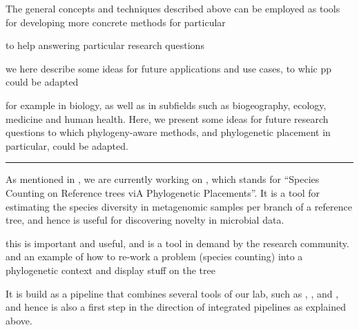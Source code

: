 
The general concepts and techniques described above %
can be employed as tools for developing more concrete methods for particular

to help answering particular research questions

we here describe some ideas for future
applications and use cases,
to whic pp could be adapted

for example
in biology, as well as in subfields such as biogeography, ecology, medicine and human health.
Here, we present some ideas for future research questions to which phylogeny-aware methods,
and phylogenetic placement in particular, could be adapted.



\noindent\rule{\textwidth}{0.4pt}

As mentioned in , we are currently working on ,
which stands for ``Species Counting on Reference trees viA Phylogenetic Placements''.
It is a tool for estimating the species diversity in metagenomic samples per branch of a reference tree,
and hence is useful for discovering novelty in microbial data.

this is important and useful, and is a tool in demand by the research community.
and an example of how to re-work a problem (species counting) into a phylogenetic context and display stuff on the tree

It is build as a pipeline that combines several tools of our lab, such as
 \cite{Barbera2018},  \cite{Morel2018}, and  \cite{Kapli2017},
and hence is also a first step in the direction of integrated pipelines as explained above.



